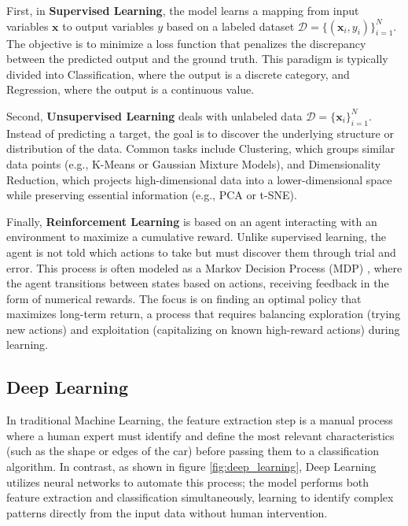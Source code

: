 First, in \textbf{Supervised Learning}, the model learns a mapping from input variables $\mathbf{x}$ to output variables $y$ based on a labeled dataset $\mathcal{D} = \{(\mathbf{x}_i, y_i)\}_{i=1}^N$. The objective is to minimize a loss function that penalizes the discrepancy between the predicted output and the ground truth. This paradigm is typically divided into Classification, where the output is a discrete category, and Regression, where the output is a continuous value.

Second, \textbf{Unsupervised Learning} deals with unlabeled data $\mathcal{D} = \{\mathbf{x}_i\}_{i=1}^N$. Instead of predicting a target, the goal is to discover the underlying structure or distribution of the data. Common tasks include Clustering, which groups similar data points (e.g., K-Means or Gaussian Mixture Models), and Dimensionality Reduction, which projects high-dimensional data into a lower-dimensional space while preserving essential information (e.g., PCA or t-SNE).

Finally, \textbf{Reinforcement Learning} is based on an agent interacting with an environment to maximize a cumulative reward. Unlike supervised learning, the agent is not told which actions to take but must discover them through trial and error. This process is often modeled as a Markov Decision Process (MDP) \cite{Sutton2018}, where the agent transitions between states based on actions, receiving feedback in the form of numerical rewards. 
The focus is on finding an optimal policy that maximizes long-term return, a process that requires balancing exploration (trying new actions) and exploitation (capitalizing on known high-reward actions) during learning.

\subsection{Deep Learning}

In traditional Machine Learning, the feature extraction step is a manual process where a human expert must identify and define the most relevant characteristics (such as the shape or edges of the car) before passing them to a classification algorithm. In contrast, as shown in figure \ref{fig:deep_learning}, Deep Learning utilizes neural networks to automate this process; the model performs both feature extraction and classification simultaneously, learning to identify complex patterns directly from the input data without human intervention.

